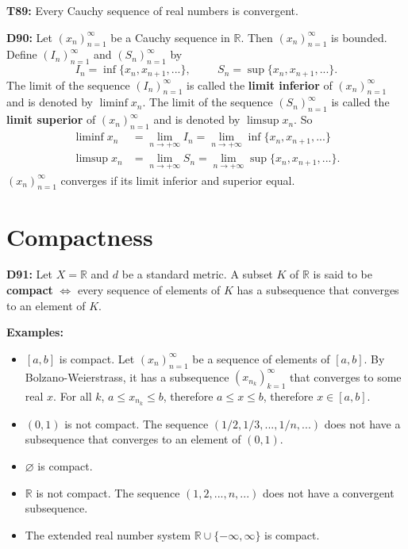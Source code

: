 \documentclass[twocolumn,10pt]{article}
\begin{document}
\textbf{T89:} Every Cauchy sequence of real numbers is convergent.

\textbf{D90:} Let $(x_n)_{n=1}^{\infty}$ be a Cauchy sequence in $\mathbb{R}$. Then $(x_n)_{n=1}^{\infty}$ is bounded. Define $(I_n)_{n=1}^{\infty}$ and $(S_n)_{n=1}^{\infty}$ by
\begin{equation*}
    I_n = \inf\{x_n,x_{n+1},...\}, \hspace{1cm} S_n = \sup\{x_n,x_{n+1},...\}.
\end{equation*}
The limit of the sequence $(I_n)_{n=1}^{\infty}$ is called the \textbf{limit inferior} of $(x_n)_{n=1}^{\infty}$ and is denoted by $\liminf x_n$. The limit of the sequence $(S_n)_{n=1}^{\infty}$ is called the \textbf{limit superior} of $(x_n)_{n=1}^{\infty}$ and is denoted by $\limsup x_n$. So
\begin{align*}
    \liminf x_n &= \lim_{n\to+\infty}I_n = \lim_{n\to+\infty}\inf\{x_n,x_{n+1},...\}\\
    \limsup x_n &= \lim_{n\to+\infty}S_n = \lim_{n\to+\infty}\sup\{x_n,x_{n+1},...\}.
\end{align*}
$(x_n)_{n=1}^{\infty}$ converges if its limit inferior and superior equal.

\section{Compactness}

\textbf{D91:} Let $X=\mathbb{R}$ and $d$ be a standard metric. A subset $K$ of $\mathbb{R}$ is said to be \textbf{compact} $\Leftrightarrow$ every sequence of elements of $K$ has a subsequence that converges to an element of $K$.

\color{red}
\textbf{Examples:}
\begin{itemize}
    \item $[a,b]$ is compact. Let $(x_n)_{n=1}^{\infty}$ be a sequence of elements of $[a,b]$. By Bolzano-Weierstrass, it has a subsequence $(x_{n_k})_{k=1}^{\infty}$ that converges to some real $x$. For all $k$, $a\leq x_{n_k}\leq b$, therefore $a\leq x\leq b$, therefore $x\in[a,b]$.
    \item $(0,1)$ is not compact. The sequence $(1/2,1/3,...,1/n,...)$ does not have a subsequence that converges to an element of $(0,1)$.
    \item $\varnothing$ is compact.
    \item $\mathbb{R}$ is not compact. The sequence $(1,2,...,n,...)$ does not have a convergent subsequence.
    \item The extended real number system $\mathbb{R}\cup\{-\infty,\infty\}$ is compact.
\end{itemize}
\color{black}
\end{document}
